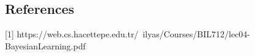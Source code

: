 \subsection*{References}

   [1] https://web.cs.hacettepe.edu.tr/~ilyas/Courses/BIL712/lec04-BayesianLearning.pdf \\ 